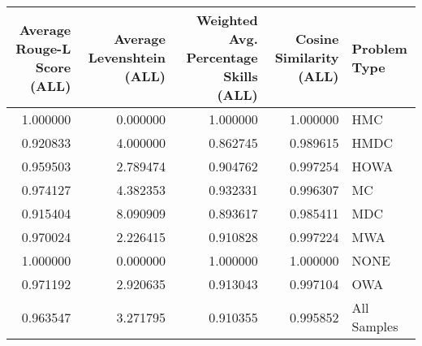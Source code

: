 \begin{tabular}{rrrrl}
\toprule
Average Rouge-L Score (ALL) & Average Levenshtein (ALL) & Weighted Avg. Percentage Skills (ALL) & Cosine Similarity (ALL) & Problem Type \\
\midrule
1.000000 & 0.000000 & 1.000000 & 1.000000 & HMC \\
0.920833 & 4.000000 & 0.862745 & 0.989615 & HMDC \\
0.959503 & 2.789474 & 0.904762 & 0.997254 & HOWA \\
0.974127 & 4.382353 & 0.932331 & 0.996307 & MC \\
0.915404 & 8.090909 & 0.893617 & 0.985411 & MDC \\
0.970024 & 2.226415 & 0.910828 & 0.997224 & MWA \\
1.000000 & 0.000000 & 1.000000 & 1.000000 & NONE \\
0.971192 & 2.920635 & 0.913043 & 0.997104 & OWA \\
0.963547 & 3.271795 & 0.910355 & 0.995852 & All Samples \\
\bottomrule
\end{tabular}
